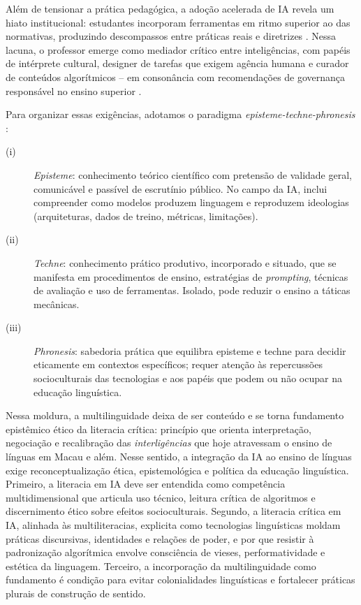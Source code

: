 \documentclass[portuguese]{textolivre}
\begin{document}
Além de tensionar a prática pedagógica, a adoção acelerada de IA revela um hiato institucional: estudantes incorporam ferramentas em ritmo superior ao das normativas, produzindo descompassos entre práticas reais e diretrizes \cite{FarazouliEtAl2024, McGrathEtAl2024}. Nessa lacuna, o professor emerge como mediador crítico entre inteligências, com papéis de intérprete cultural, designer de tarefas que exigem agência humana e curador de conteúdos algorítmicos – em consonância com recomendações de governança responsável no ensino superior \cite{UNESCO2023}.

Para organizar essas exigências, adotamos o paradigma \textit{episteme-techne-phronesis} \cite{SperlingEtAl2024}:

\begin{description}
  \item[(i)] \textit{Episteme}: conhecimento teórico científico com pretensão de validade geral, comunicável e passível de escrutínio público. No campo da IA, inclui compreender como modelos produzem linguagem e reproduzem ideologias (arquiteturas, dados de treino, métricas, limitações).
  \item[(ii)] \textit{Techne}: conhecimento prático produtivo, incorporado e situado, que se manifesta em procedimentos de ensino, estratégias de \textit{prompting}, técnicas de avaliação e uso de ferramentas. Isolado, pode reduzir o ensino a táticas mecânicas.
  \item[(iii)] \textit{Phronesis}: sabedoria prática que equilibra episteme e techne para decidir eticamente em contextos específicos; requer atenção às repercussões socioculturais das tecnologias e aos papéis que podem ou não ocupar na educação linguística.
\end{description}

Nessa moldura, a multilinguidade deixa de ser conteúdo e se torna fundamento epistêmico ético da literacia crítica: princípio que orienta interpretação, negociação e recalibração das \textit{interligências} que hoje atravessam o ensino de línguas em Macau e além. Nesse sentido, a integração da IA ao ensino de línguas exige reconceptualização ética, epistemológica e política da educação linguística. Primeiro, a literacia em IA \cite{LongMagerko2020, NgEtAl2021, UNESCO2023, UNESCO2025} deve ser entendida como competência multidimensional que articula uso técnico, leitura crítica de algoritmos e discernimento ético sobre efeitos socioculturais. Segundo, a literacia crítica em IA, alinhada às multiliteracias, explicita como tecnologias linguísticas moldam práticas discursivas, identidades e relações de poder, e por que resistir à padronização algorítmica envolve consciência de vieses, performatividade e estética da linguagem. Terceiro, a incorporação da multilinguidade como fundamento \cite{Agnihotri2025} é condição para evitar colonialidades linguísticas e fortalecer práticas plurais de construção de sentido.
\end{document}
